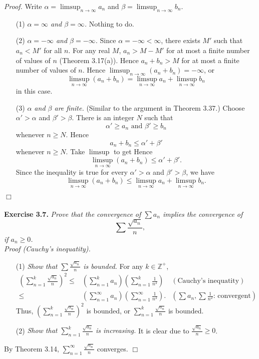 \documentclass{article}
\begin{document}
\emph{Proof.}
Write
$\alpha = \limsup_{n \to \infty} a_n$
and
$\beta = \limsup_{n \to \infty} b_n$.
\begin{enumerate}
\item[(1)]
\emph{$\alpha = \infty$ and $\beta = \infty$.}
Nothing to do.
\item[(2)]
\emph{$\alpha = -\infty$ and $\beta = -\infty$.}
Since $\alpha = -\infty < \infty$,
there exists $M'$ such that $a_n < M'$ for all $n$.
For any real $M$, $a_n > M - M'$ for at most a finite number of values of $n$
(Theorem 3.17(a)).
Hence $a_n + b_n > M$ for at most a finite number of values of $n$.
Hence $\limsup_{n \to \infty} (a_n + b_n) = -\infty$,
or
$$\limsup_{n \to \infty} (a_n + b_n)
= \limsup_{n \to \infty} a_n + \limsup_{n \to \infty} b_n$$
in this case.
\item[(3)]
\emph{$\alpha$ and $\beta$ are finite.}
(Similar to the argument in Theorem 3.37.)
Choose $\alpha' > \alpha$ and $\beta' > \beta$.
There is an integer $N$ such that
$$\alpha' \geq a_n \text{ and } \beta' \geq b_n$$
whenever $n \geq N$.
Hence $$a_n + b_n \leq \alpha' + \beta'$$
whenever $n \geq N$. Take $\limsup$ to get
Hence $$\limsup_{n \to \infty} (a_n + b_n) \leq \alpha' + \beta'.$$
Since the inequality is true for every $\alpha' > \alpha$ and $\beta' > \beta$,
we have
$$\limsup_{n \to \infty} (a_n + b_n)
\leq \limsup_{n \to \infty} a_n + \limsup_{n \to \infty} b_n.$$
\end{enumerate}
$\Box$ \\\\






\textbf{Exercise 3.7.}
\emph{Prove that the convergence of $\sum a_n$ implies the convergence of
$$\sum \frac{\sqrt{a_n}}{n},$$
if $a_n \geq 0$.} \\

\emph{Proof (Cauchy's inequatity).}
\begin{enumerate}
\item[(1)]
\emph{Show that $\sum\frac{\sqrt{a_n}}{n}$ is bounded.}
For any $k \in \mathbb{Z}^{+}$,
\begin{align*}
\left( \sum_{n=1}^{k} \frac{\sqrt{a_n}}{n} \right)^2
\leq&
\left( \sum_{n=1}^{k}{a_n} \right)
\left( \sum_{n=1}^{k}{\frac{1}{n^2}} \right)
  &(\text{Cauchy's inequatity}) \\
\leq& \left( \sum^{\infty}_{n=1}{a_n} \right)
\left( \sum^{\infty}_{n=1}{\frac{1}{n^2}} \right).
  &\left(\text{$\sum{a_n}, \sum{\frac{1}{n^2}}$: convergent}\right)
\end{align*}
Thus,
$\left( \sum_{n=1}^{k}\frac{\sqrt{a_n}}{n} \right)^2$ is bounded,
or $\sum_{n=1}^{k}\frac{\sqrt{a_n}}{n}$ is bounded.
\item[(2)]
\emph{Show that $\sum_{n=1}^{k} \frac{\sqrt{a_n}}{n}$ is increasing.}
It is clear due to $\frac{\sqrt{a_n}}{n} \geq 0$.
\end{enumerate}
By Theorem 3.14, $\sum_{n=1}^{\infty} \frac{\sqrt{a_n}}{n}$ converges.
$\Box$ \\
\end{document}
